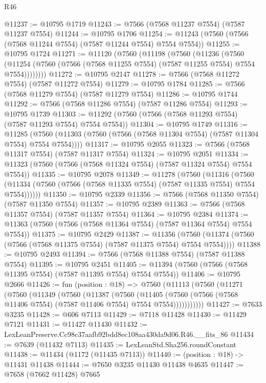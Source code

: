 \begin{lexlean}{R46}
\begin{coremodule}
@11237 := @10795 @1719
@11243 := @7566 (@7568 @11237 @7554) (@7587 @11237 @7554)
@11244 := @10795 @1706
@11254 := @11243 (@7560 (@7566 (@7568 @11244 @7554) (@7587 @11244 @7554) @7554 @7554))
@11255 := @10795 @1724
@11271 := @11120
    (@7560
      (@11198
        (@7560
          (@11236
            (@7560
              (@11254 (@7560 (@7566 (@7568 @11255 @7554) (@7587 @11255 @7554) @7554 @7554))))))))
@11272 := @10795 @2147
@11278 := @7566 (@7568 @11272 @7554) (@7587 @11272 @7554)
@11279 := @10795 @1784
@11285 := @7566 (@7568 @11279 @7554) (@7587 @11279 @7554)
@11286 := @10795 @1744
@11292 := @7566 (@7568 @11286 @7554) (@7587 @11286 @7554)
@11293 := @10795 @1739
@11303 := @11292 (@7560 (@7566 (@7568 @11293 @7554) (@7587 @11293 @7554) @7554 @7554))
@11304 := @10795 @1749
@11316 := @11285
    (@7560 (@11303 (@7560 (@7566 (@7568 @11304 @7554) (@7587 @11304 @7554) @7554 @7554))))
@11317 := @10795 @2055
@11323 := @7566 (@7568 @11317 @7554) (@7587 @11317 @7554)
@11324 := @10795 @2051
@11334 := @11323 (@7560 (@7566 (@7568 @11324 @7554) (@7587 @11324 @7554) @7554 @7554))
@11335 := @10795 @2078
@11349 := @11278
    (@7560
      (@11316
        (@7560 (@11334 (@7560 (@7566 (@7568 @11335 @7554) (@7587 @11335 @7554) @7554 @7554))))))
@11350 := @10795 @2339
@11356 := @7566 (@7568 @11350 @7554) (@7587 @11350 @7554)
@11357 := @10795 @2389
@11363 := @7566 (@7568 @11357 @7554) (@7587 @11357 @7554)
@11364 := @10795 @2384
@11374 := @11363 (@7560 (@7566 (@7568 @11364 @7554) (@7587 @11364 @7554) @7554 @7554))
@11375 := @10795 @2429
@11387 := @11356
    (@7560 (@11374 (@7560 (@7566 (@7568 @11375 @7554) (@7587 @11375 @7554) @7554 @7554))))
@11388 := @10795 @2493
@11394 := @7566 (@7568 @11388 @7554) (@7587 @11388 @7554)
@11395 := @10795 @2451
@11405 := @11394 (@7560 (@7566 (@7568 @11395 @7554) (@7587 @11395 @7554) @7554 @7554))
@11406 := @10795 @2666
@11426 := fun (position : @18) =>
  @7560
    (@11113
      (@7560
        (@11271
          (@7560
            (@11349
              (@7560
                (@11387
                  (@7560
                    (@11405
                      (@7560 (@7566 (@7568 @11406 @7554) (@7587 @11406 @7554) @7554 @7554)))))))))))
@11427 := @7633 @3235
@11428 := @606 @7113
@11429 := @7118 @11428
@11430 := @11429 @7121
@11431 := @11427 @11430
@11432 := LexLeanPreserve.Cc98c37aafb92bdd8ec108aa430da9d06.R46.__fits_86
@11434 := @7639 (@11432 @7113)
@11435 := LexLeanStd.Sha256.roundConstant
@11438 := @11434 (@1172 (@11435 @7113))
@11440 := (position : @18) -> @11431 @11438
@11444 := @7650 @3235 @11430 @11438 @4635
@11447 := @7658 (@7662 @11428) @7665

\end{coremodule}
\end{lexlean}
